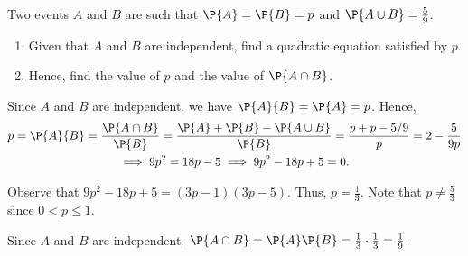 \clearpage
\begin{problem}
    Two events $A$ and $B$ are such that $\P{A} = \P{B} = p$ and $\P{A \cup B} = \frac59$.
    \begin{enumerate}
        \item Given that $A$ and $B$ are independent, find a quadratic equation satisfied by $p$.
        \item Hence, find the value of $p$ and the value of $\P{A \cap B}$.
    \end{enumerate}
\end{problem}
\begin{solution}
    \begin{ppart}
        Since $A$ and $B$ are independent, we have $\P{A}{B} = \P{A} = p$. Hence,
        \begin{gather*}
            p = \P{A}{B} = \frac{\P{A \cap B}}{\P{B}} = \frac{\P{A} + \P{B} - \P{A \cup B}}{\P{B}} = \frac{p + p - 5/9}{p} = 2 - \frac{5}{9p}\\
            \implies  9p^2 = 18p - 5 \implies 9p^2 - 18p + 5 = 0.
        \end{gather*}
    \end{ppart}
    \begin{ppart}
        Observe that $9p^2 - 18p + 5 = (3p - 1)(3p - 5)$.  Thus, $p = \frac13$. Note that $p \neq \frac53$ since $0 < p \leq 1$.

        Since $A$ and $B$ are independent, $\P{A \cap B} = \P{A} \P{B} = \frac13 \cdot \frac13 = \frac19$.
    \end{ppart}
\end{solution}

